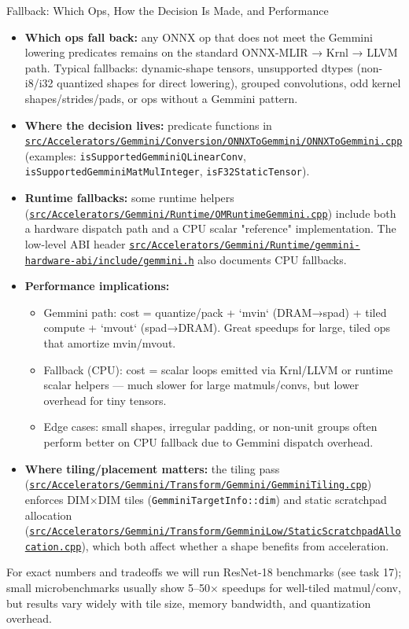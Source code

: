 \documentclass[aspectratio=169,10pt]{beamer}
\newcommand{\code}[1]{\texttt{\footnotesize #1}}
\newcommand{\repoRoot}{/home/lahcen/toolchains/onnx-mlir-xcompile/onnx-mlir}
\newcommand{\pathcode}[1]{\href{run:\repoRoot/#1}{\texttt{\scriptsize #1}}}
\begin{document}
\begin{frame}{Fallback: Which Ops, How the Decision Is Made, and Performance}
  \scriptsize
  \begin{itemize}
    \item \textbf{Which ops fall back:} any ONNX op that does not meet the Gemmini
      lowering predicates remains on the standard ONNX-MLIR → Krnl → LLVM path.
      Typical fallbacks: dynamic-shape tensors, unsupported dtypes (non-i8/i32
      quantized shapes for direct lowering), grouped convolutions, odd kernel
      shapes/strides/pads, or ops without a Gemmini pattern.
    \item \textbf{Where the decision lives:} predicate functions in
      \pathcode{src/Accelerators/Gemmini/Conversion/ONNXToGemmini/ONNXToGemmini.cpp}
      (examples: \code{isSupportedGemminiQLinearConv}, \code{isSupportedGemminiMatMulInteger}, \code{isF32StaticTensor}).
    \item \textbf{Runtime fallbacks:} some runtime helpers (\pathcode{src/Accelerators/Gemmini/Runtime/OMRuntimeGemmini.cpp}) include both a hardware dispatch path and a CPU scalar "reference" implementation. The low-level ABI header \pathcode{src/Accelerators/Gemmini/Runtime/gemmini-hardware-abi/include/gemmini.h} also documents CPU fallbacks.
    \item \textbf{Performance implications:}
      \begin{itemize}
        \item Gemmini path: cost = quantize/pack + `mvin` (DRAM→spad) + tiled compute + `mvout` (spad→DRAM). Great speedups for large, tiled ops that amortize mvin/mvout.
        \item Fallback (CPU): cost = scalar loops emitted via Krnl/LLVM or runtime scalar helpers — much slower for large matmuls/convs, but lower overhead for tiny tensors.
        \item Edge cases: small shapes, irregular padding, or non-unit groups often perform better on CPU fallback due to Gemmini dispatch overhead.
      \end{itemize}
    \item \textbf{Where tiling/placement matters:} the tiling pass (\pathcode{src/Accelerators/Gemmini/Transform/Gemmini/GemminiTiling.cpp}) enforces DIM×DIM tiles (\code{GemminiTargetInfo::dim}) and static scratchpad allocation (\pathcode{src/Accelerators/Gemmini/Transform/GemminiLow/StaticScratchpadAllocation.cpp}), which both affect whether a shape benefits from acceleration.
  \end{itemize}
  \vspace{0.5em}
  {\tiny For exact numbers and tradeoffs we will run ResNet-18 benchmarks (see task 17); small microbenchmarks usually show 5–50× speedups for well-tiled matmul/conv, but results vary widely with tile size, memory bandwidth, and quantization overhead.}
\end{frame}
\end{document}
